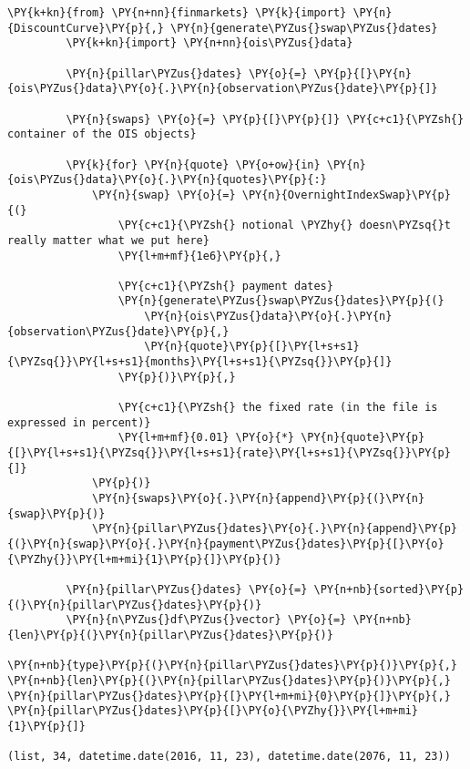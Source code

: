 \begin{Verbatim}[commandchars=\\\{\}]
\PY{k+kn}{from} \PY{n+nn}{finmarkets} \PY{k}{import} \PY{n}{DiscountCurve}\PY{p}{,} \PY{n}{generate\PYZus{}swap\PYZus{}dates}
         \PY{k+kn}{import} \PY{n+nn}{ois\PYZus{}data}
         
         \PY{n}{pillar\PYZus{}dates} \PY{o}{=} \PY{p}{[}\PY{n}{ois\PYZus{}data}\PY{o}{.}\PY{n}{observation\PYZus{}date}\PY{p}{]}
         
         \PY{n}{swaps} \PY{o}{=} \PY{p}{[}\PY{p}{]} \PY{c+c1}{\PYZsh{} container of the OIS objects}
         
         \PY{k}{for} \PY{n}{quote} \PY{o+ow}{in} \PY{n}{ois\PYZus{}data}\PY{o}{.}\PY{n}{quotes}\PY{p}{:}
             \PY{n}{swap} \PY{o}{=} \PY{n}{OvernightIndexSwap}\PY{p}{(}
                 \PY{c+c1}{\PYZsh{} notional \PYZhy{} doesn\PYZsq{}t really matter what we put here}
                 \PY{l+m+mf}{1e6}\PY{p}{,}
                 
                 \PY{c+c1}{\PYZsh{} payment dates}
                 \PY{n}{generate\PYZus{}swap\PYZus{}dates}\PY{p}{(}
                     \PY{n}{ois\PYZus{}data}\PY{o}{.}\PY{n}{observation\PYZus{}date}\PY{p}{,}
                     \PY{n}{quote}\PY{p}{[}\PY{l+s+s1}{\PYZsq{}}\PY{l+s+s1}{months}\PY{l+s+s1}{\PYZsq{}}\PY{p}{]}
                 \PY{p}{)}\PY{p}{,}
                 
                 \PY{c+c1}{\PYZsh{} the fixed rate (in the file is expressed in percent)}
                 \PY{l+m+mf}{0.01} \PY{o}{*} \PY{n}{quote}\PY{p}{[}\PY{l+s+s1}{\PYZsq{}}\PY{l+s+s1}{rate}\PY{l+s+s1}{\PYZsq{}}\PY{p}{]}
             \PY{p}{)}
             \PY{n}{swaps}\PY{o}{.}\PY{n}{append}\PY{p}{(}\PY{n}{swap}\PY{p}{)}
             \PY{n}{pillar\PYZus{}dates}\PY{o}{.}\PY{n}{append}\PY{p}{(}\PY{n}{swap}\PY{o}{.}\PY{n}{payment\PYZus{}dates}\PY{p}{[}\PY{o}{\PYZhy{}}\PY{l+m+mi}{1}\PY{p}{]}\PY{p}{)}
             
         \PY{n}{pillar\PYZus{}dates} \PY{o}{=} \PY{n+nb}{sorted}\PY{p}{(}\PY{n}{pillar\PYZus{}dates}\PY{p}{)}
         \PY{n}{n\PYZus{}df\PYZus{}vector} \PY{o}{=} \PY{n+nb}{len}\PY{p}{(}\PY{n}{pillar\PYZus{}dates}\PY{p}{)}

\PY{n+nb}{type}\PY{p}{(}\PY{n}{pillar\PYZus{}dates}\PY{p}{)}\PY{p}{,} \PY{n+nb}{len}\PY{p}{(}\PY{n}{pillar\PYZus{}dates}\PY{p}{)}\PY{p}{,} \PY{n}{pillar\PYZus{}dates}\PY{p}{[}\PY{l+m+mi}{0}\PY{p}{]}\PY{p}{,} \PY{n}{pillar\PYZus{}dates}\PY{p}{[}\PY{o}{\PYZhy{}}\PY{l+m+mi}{1}\PY{p}{]}

(list, 34, datetime.date(2016, 11, 23), datetime.date(2076, 11, 23))
\end{Verbatim}

